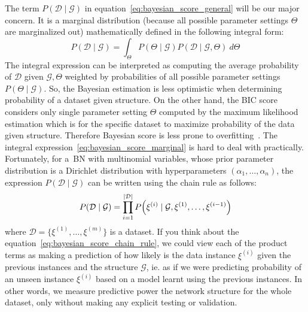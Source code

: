 \documentclass[english,cover]{fitthesis} %
\begin{document}
The term $P(\mathcal{D} \mid \mathcal{G})$ in equation~\eqref{eq:bayesian_score_general} will be our major concern. It is a marginal distribution (because all possible parameter settings $\Theta$ are marginalized out) mathematically defined in the following integral form:
\begin{equation}\label{eq:bayesian_score_marginal}
    P(\mathcal{D} \mid \mathcal{G})
    =
    \int_{\Theta} P(\Theta \mid \mathcal{G}) P(\mathcal{D} \mid \mathcal{G}, \Theta) \ d \Theta
\end{equation}
The integral expression can be interpreted as computing the average probability of $\mathcal{D}$ given $\mathcal{G},\Theta$ weighted by probabilities of all possible parameter settings $P(\Theta \mid \mathcal{G})$. So, the Bayesian estimation is less optimistic when determining probability of a dataset given structure. On the other hand, the BIC score considers only single parameter setting $\Theta$ computed by the maximum likelihood estimation which is  for the specific dataset to maximize probability of the data given structure. Therefore Bayesian score is less prone to overfitting~\cite[p.~795]{pgm}.
The integral expression~\eqref{eq:bayesian_score_marginal} is hard to deal with practically. Fortunately, for a~BN with multinomial variables, whose prior parameter distribution is a Dirichlet distribution with hyperparameters $(\alpha_1, \dots, \alpha_n)$, the expression $P(\mathcal{D} \mid \mathcal{G})$ can be written using the chain rule as follows:
\begin{equation}\label{eq:bayesian_score_chain_rule}
    P(\mathcal{D} \mid \mathcal{G})
    =
     \prod_{i = 1}^{| \mathcal{D} |}
             P \Bigl( \xi^{(i)} \mid \mathcal{G}, \xi^{(1)}, \dots, \xi^{(i - 1)} \Bigr)
\end{equation}
where $\mathcal{D} = \lbrace \xi^{(1)}, \dots, \xi^{(m)} \rbrace$ is a dataset. If you think about the equation~\eqref{eq:bayesian_score_chain_rule}, we could view each of the product terms as making a prediction of how likely is the data instance $\xi^{(i)}$ given the previous instances and the structure $\mathcal{G}$, ie. as if we were predicting probability of an unseen instance $\xi^{(i)}$ based on a model learnt using the previous instances. In other words, we measure predictive power the network structure for the whole dataset, only without making any explicit testing or validation.
\end{document}
